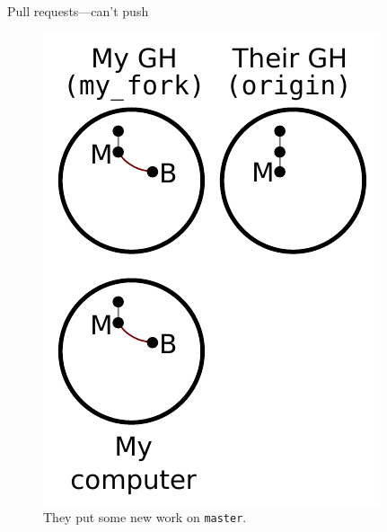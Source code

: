 \begin{frame}{Pull requests---can't push}
  \begin{figure}
    \includegraphics{fork_006.pdf}
    \\ They put some new work on \texttt{master}.
    \\ \texttt{}
  \end{figure}
\end{frame}


